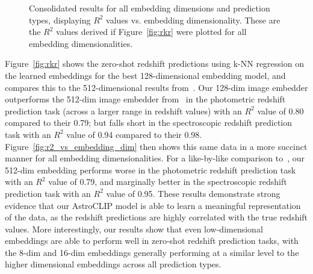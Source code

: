 \begin{figure}[t]
    \centering
    \caption{Consolidated results for all embedding dimensions and prediction types, displaying $R^{2}$ values vs. embedding dimensionality.
    These are the $R^{2}$ values derived if Figure~\eqref{fig:rkr} were plotted for all embedding dimensionalities.}
    \label{fig:r2_vs_embedding_dim}
\end{figure}

Figure~\eqref{fig:rkr} shows the zero-shot redshift predictions using k-NN regression on the learned embeddings for
the best 128-dimensional embedding model, and compares this to the 512-dimensional results from~\cite{astroclip}.
Our 128-dim image embedder outperforms the 512-dim image embedder from~\cite{astroclip} in the photometric redshift
prediction task (across a larger range in redshift values) with an $R^{2}$ value of 0.80 compared to their 0.79;
but falls short in the spectroscopic redshift prediction task with an $R^{2}$ value of 0.94 compared to their 0.98.
Figure~\eqref{fig:r2_vs_embedding_dim} then shows this same data in a more succinct manner for all embedding dimensionalities.
For a like-by-like comparison to~\cite{astroclip}, our 512-dim embedding performs worse in the photometric redshift prediction
task with an $R^{2}$ value of 0.79, and marginally better in the spectroscopic redshift prediction task with an $R^{2}$ value
of 0.95.
These results demonstrate strong evidence that our AstroCLIP model is able to learn a meaningful representation of the
data, as the redshift predictions are highly correlated with the true redshift values.
More interestingly, our results show that even low-dimensional embeddings are able to perform well in zero-shot
redshift prediction tasks, with the 8-dim and 16-dim embeddings generally performing at a similar level to the higher
dimensional embeddings across all prediction types.

